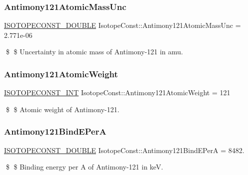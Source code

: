 \subsubsection{\texorpdfstring{Antimony121\+Atomic\+Mass\+Unc}{Antimony121AtomicMassUnc}}
{\footnotesize\ttfamily \mbox{\hyperlink{group___isotope_const-_macros_ga8f45a7272ce02c0b4c65c44636ed719a}{I\+S\+O\+T\+O\+P\+E\+C\+O\+N\+S\+T\+\_\+\+D\+O\+U\+B\+LE}} Isotope\+Const\+::\+Antimony121\+Atomic\+Mass\+Unc = 2.\+771e-\/06}

\$ \$ Uncertainty in atomic mass of Antimony-\/121 in amu. \mbox{\label{group___isotope_const-_antimony-_sb121_gad310803fb3095845ea83065932b1572b}} 
\subsubsection{\texorpdfstring{Antimony121\+Atomic\+Weight}{Antimony121AtomicWeight}}
{\footnotesize\ttfamily \mbox{\hyperlink{group___isotope_const-_macros_ga5f18360b3e99483a35c32d789e62621c}{I\+S\+O\+T\+O\+P\+E\+C\+O\+N\+S\+T\+\_\+\+I\+NT}} Isotope\+Const\+::\+Antimony121\+Atomic\+Weight = 121}

\$ \$ Atomic weight of Antimony-\/121. \mbox{\label{group___isotope_const-_antimony-_sb121_ga97c3513c655747e5275db3c9f84fec20}} 
\subsubsection{\texorpdfstring{Antimony121\+Bind\+E\+PerA}{Antimony121BindEPerA}}
{\footnotesize\ttfamily \mbox{\hyperlink{group___isotope_const-_macros_ga8f45a7272ce02c0b4c65c44636ed719a}{I\+S\+O\+T\+O\+P\+E\+C\+O\+N\+S\+T\+\_\+\+D\+O\+U\+B\+LE}} Isotope\+Const\+::\+Antimony121\+Bind\+E\+PerA = 8482.}

\$ \$ Binding energy per A of Antimony-\/121 in keV. \mbox{\label{group___isotope_const-_antimony-_sb121_gaf6bc2fdb9f9f3d3fe9df0f25821ed56b}} 
